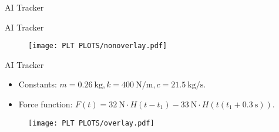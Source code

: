 \documentclass[compress,12pt,mp]{beamer}
\begin{document}
\begin{frame}[t]{AI Tracker}
\end{frame}

\begin{frame}[c]{AI Tracker}
    \begin{figure}
       \centering
        \texttt{[image: PLT PLOTS/nonoverlay.pdf]}
    \end{figure}
\end{frame}

\begin{frame}[c]{AI Tracker}
    \begin{itemize}
    \item Constants: $m=\qty{0.26}{\kg}, k=\SI[per-mode=symbol]{400}{\N\per\m}, c=\SI[per-mode=symbol]{21.5}{\kg\per\s}$.
    \item Force function: $F(t)=\qty{32}{\N}\cdot H(t-t_1)-\qty{33}{\N}\cdot H(t(t_1+\qty{0.3}{\s}))$.
    \end{itemize}
    \begin{figure}
        \centering
        \texttt{[image: PLT PLOTS/overlay.pdf]}
    \end{figure}
\end{frame}
\end{document}

